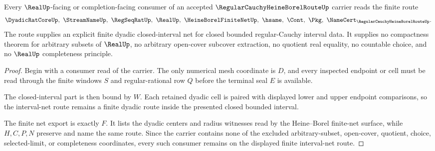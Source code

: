 \begin{theorem}
\label{thm:regular-cauchy-heine-borel-route-finite-net}
Every $\RealUp$-facing or completion-facing consumer of an accepted $\RegularCauchyHeineBorelRouteUp$ carrier reads the finite route
$$
\DyadicRatCoreUp,\ \StreamNameUp,\ \RegSeqRatUp,\ \RealUp,\ \HeineBorelFiniteNetUp,\ \hsame,\ \Cont,\ \Pkg,\ \NameCert_{\RegularCauchyHeineBorelRouteUp}.
$$
The route supplies an explicit finite dyadic closed-interval net for closed bounded regular-Cauchy interval data. It supplies no compactness theorem for arbitrary subsets of $\RealUp$, no arbitrary open-cover subcover extraction, no quotient real equality, no countable choice, and no $\RealUp$ completeness principle.
\end{theorem}
\begin{proof}
Begin with a consumer read of the carrier. The only numerical mesh coordinate is $D$, and every inspected endpoint or cell must be read through the finite windows $S$ and regular-rational row $Q$ before the terminal seal $E$ is available.

The closed-interval part is then bound by $W$. Each retained dyadic cell is paired with displayed lower and upper endpoint comparisons, so the interval-net route remains a finite dyadic route inside the presented closed bounded interval.

The finite net export is exactly $F$. It lists the dyadic centers and radius witnesses read by the Heine--Borel finite-net surface, while $H,C,P,N$ preserve and name the same route. Since the carrier contains none of the excluded arbitrary-subset, open-cover, quotient, choice, selected-limit, or completeness coordinates, every such consumer remains on the displayed finite interval-net route.
\end{proof}

